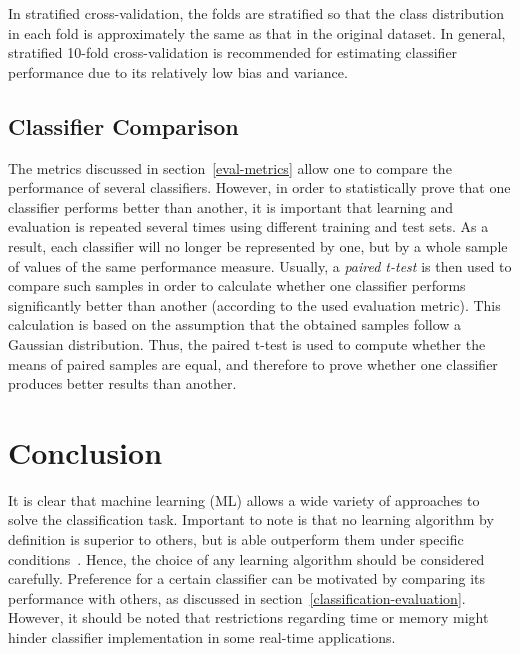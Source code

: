 In stratified cross-validation, the folds are stratified so that the class distribution in each fold is approximately the same as that in the original dataset. In general, stratified 10-fold cross-validation is recommended for estimating classifier performance due to its relatively low bias and variance.~\cite{Jiawei06}


\subsection{Classifier Comparison}\label{classifcomp}
The metrics discussed in section~\ref{eval-metrics} allow one to compare the performance of several classifiers. However, in order to statistically prove that one classifier performs better than another, it is important that learning and evaluation is repeated several times using different training and test sets. As a result, each classifier will no longer be represented by one, but by a whole sample of values of the same performance measure. Usually, a \textit{paired t-test} is then used to compare such samples in order to calculate whether one classifier performs significantly better than another (according to the used evaluation metric). This calculation is based on the assumption that the obtained samples follow a Gaussian distribution. Thus, the paired t-test is used to compute whether the means of paired samples are equal, and therefore to prove whether one classifier produces better results than another.

\section{Conclusion}
It is clear that machine learning (ML) allows a wide variety of approaches to solve the classification task. Important to note is that no learning algorithm by definition is superior to others, but is able outperform them under specific conditions~\cite{supervised06}. Hence, the choice of any learning algorithm should be considered carefully. Preference for a certain classifier can be motivated by comparing its performance with others, as discussed in section~\ref{classification-evaluation}. However, it should be noted that restrictions regarding time or memory might hinder classifier implementation in some real-time applications.


